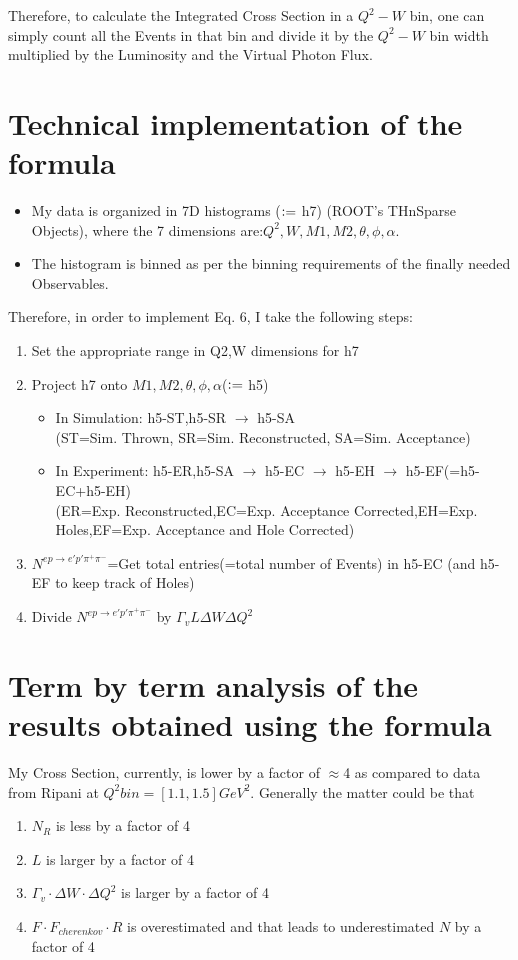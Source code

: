 \documentclass[12pt]{article}
\newcommand{\defeq}{\vcentcolon=}
\begin{document}
Therefore, to calculate the Integrated Cross Section in a $Q^2-W$ bin, one can simply count all the Events in that bin and divide it by the $Q^2-W$ bin width multiplied by the Luminosity and the Virtual Photon Flux.


\section{Technical implementation of the formula}
\begin{itemize}
	\item My data is organized in 7D histograms ($\defeq$ h7) (ROOT's THnSparse Objects), where the 7 dimensions are:$Q^2,W,M1,M2,\theta,\phi,\alpha$.
	\item The histogram is binned as per the binning requirements of the finally needed Observables.
\end{itemize}

Therefore, in order to implement Eq. 6, I take the following steps:
\begin{enumerate}
	\item Set the appropriate range in Q2,W dimensions for h7
	\item Project h7 onto $M1,M2,\theta,\phi,\alpha$($\defeq$ h5)
	\begin{itemize}
		\item In Simulation: h5-ST,h5-SR $\rightarrow$ h5-SA \\
		(ST=Sim. Thrown, SR=Sim. Reconstructed, SA=Sim. Acceptance)
		\item In Experiment: h5-ER,h5-SA $\rightarrow$ h5-EC $\rightarrow$ h5-EH $\rightarrow$ h5-EF(=h5-EC+h5-EH)\\
		(ER=Exp. Reconstructed,EC=Exp. Acceptance Corrected,EH=Exp. Holes,EF=Exp. Acceptance and Hole Corrected)
	\end{itemize}
	\item $N^{ep \rightarrow e'p'\pi^{+}\pi^{-}}$=Get total entries(=total number of Events) in h5-EC (and h5-EF to keep track of Holes)
	\item Divide $N^{ep \rightarrow e'p'\pi^{+}\pi^{-}}$ by $\Gamma_{v} L \Delta W \Delta Q^{2}$
\end{enumerate}

\section{Term by term analysis of the results obtained using the formula}
My Cross Section, currently, is lower by a factor of $\approx$4 as compared to data from Ripani at $Q^2 bin = [1.1,1.5] GeV^{2}$. Generally the matter could be that
\begin{enumerate}
	\item $N_{R}$ is less by a factor of 4
	\item $L$ is larger by a factor of 4
	\item $\Gamma_{v} \cdot \Delta W \cdot \Delta Q^{2}$ is larger by a factor of 4
	\item $F \cdot F_{cherenkov} \cdot R$ is overestimated and that leads to underestimated $N$ by a factor of 4
\end{enumerate}
\end{document}

